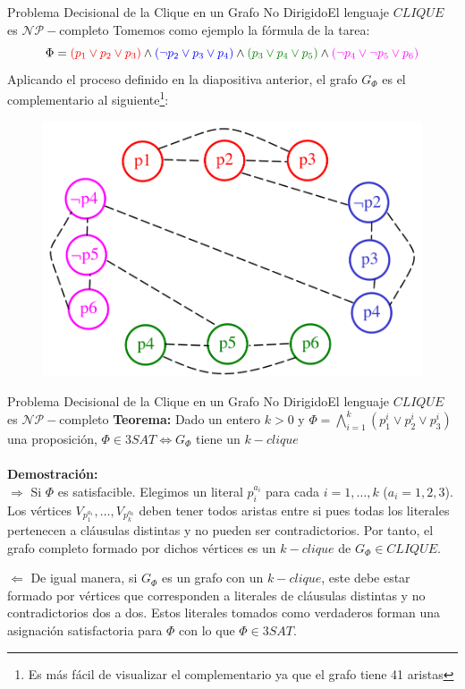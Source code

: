 \documentclass[10pt, envcountsect, presentation, aspectratio=169]{beamer}
\begin{document}
\begin{frame}{Problema Decisional de la Clique en un Grafo No Dirigido}{El lenguaje $CLIQUE$ es $\mathcal{NP}-$completo}
    Tomemos como ejemplo la fórmula de la tarea: 
    $$
    \Phi = \textcolor{red}{(p_1 \vee p_2 \vee p_3)} \wedge \textcolor{blue}{(\neg p_2 \vee p_3 \vee p_4)} \wedge \textcolor{darkgreen}{(p_3 \vee p_4 \vee p_5)} \wedge \textcolor{fucsia}{(\neg p_4 \vee \neg p_5 \vee p_6)}
    $$
    Aplicando el proceso definido en la diapositiva anterior, el grafo $G_\Phi$ es el complementario al siguiente\footnote{Es más fácil de visualizar el complementario ya que el grafo tiene 41 aristas}:
    \begin{figure}
        \includegraphics[scale=0.15]{images/T2_2_ejemplophi.png}
    \end{figure} 
\end{frame}

\begin{frame}{Problema Decisional de la Clique en un Grafo No Dirigido}{El lenguaje $CLIQUE$ es $\mathcal{NP}-$completo}
    \textbf{Teorema:} Dado un entero $k>0$ y $\Phi=\bigwedge_{i=1}^k(p_1^i \vee p_2^i \vee p_3^i)$ una proposición, $\Phi \in 3SAT \Leftrightarrow G_\Phi$ tiene un $k-clique$ \\~\\

    \textbf{Demostración:} \\
    $\boxed{\Rightarrow}$ Si $\Phi$ es satisfacible. Elegimos un literal $p_i^{a_i}$ para cada $i=1,\dots,k$ ($a_i=1,2,3$). Los vértices $V_{p_1^{a_1}},\dots,V_{p_k^{a_k}}$ deben tener todos aristas entre si pues todas los literales pertenecen a cláusulas distintas y no pueden ser contradictorios.
    Por tanto, el grafo completo formado por dichos vértices es un $k-clique$ de $G_\Phi \in CLIQUE$.

    $\boxed{\Leftarrow}$ De igual manera, si $G_\Phi$ es un grafo con un $k-clique$, este debe estar formado por vértices que corresponden a literales de cláusulas distintas y no contradictorios dos a dos.
    Estos literales tomados como verdaderos forman una asignación satisfactoria para $\Phi$ con lo que $\Phi \in 3SAT$.
\end{frame}
\end{document}
